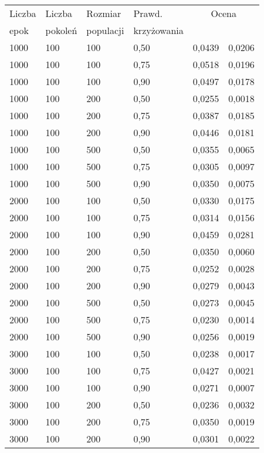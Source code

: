 \documentclass[11pt,a4paper,oneside]{report}
\begin{document}
\begin{center} 
	\begin{longtable}{|l|l|l|l|r@{$\pm$}r|}
		\hline
		Liczba & Liczba & Rozmiar & Prawd. & \multicolumn{2}{|c|}{Ocena} \\
		epok & pokoleń & populacji & krzyżowania & \multicolumn{2}{|c|}{}\\ \hline \hline\endhead
		1000 & 100 & 100 & 0,50 & 0,0439 & 0,0206\\ \hline
		1000 & 100 & 100 & 0,75 & 0,0518 & 0,0196\\ \hline
		1000 & 100 & 100 & 0,90 & 0,0497 & 0,0178\\ \hline
		1000 & 100 & 200 & 0,50 & 0,0255 & 0,0018\\ \hline
		1000 & 100 & 200 & 0,75 & 0,0387 & 0,0185\\ \hline
		1000 & 100 & 200 & 0,90 & 0,0446 & 0,0181\\ \hline
		1000 & 100 & 500 & 0,50 & 0,0355 & 0,0065\\ \hline
		1000 & 100 & 500 & 0,75 & 0,0305 & 0,0097\\ \hline
		1000 & 100 & 500 & 0,90 & 0,0350 & 0,0075\\ \hline
		2000 & 100 & 100 & 0,50 & 0,0330 & 0,0175\\ \hline
		2000 & 100 & 100 & 0,75 & 0,0314 & 0,0156\\ \hline
		2000 & 100 & 100 & 0,90 & 0,0459 & 0,0281\\ \hline
		2000 & 100 & 200 & 0,50 & 0,0350 & 0,0060\\ \hline
		2000 & 100 & 200 & 0,75 & 0,0252 & 0,0028\\ \hline
		2000 & 100 & 200 & 0,90 & 0,0279 & 0,0043\\ \hline
		2000 & 100 & 500 & 0,50 & 0,0273 & 0,0045\\ \hline
		2000 & 100 & 500 & 0,75 & 0,0230 & 0,0014\\ \hline
		2000 & 100 & 500 & 0,90 & 0,0256 & 0,0019\\ \hline
		3000 & 100 & 100 & 0,50 & 0,0238 & 0,0017\\ \hline
		3000 & 100 & 100 & 0,75 & 0,0427 & 0,0021\\ \hline
		3000 & 100 & 100 & 0,90 & 0,0271 & 0,0007\\ \hline
		3000 & 100 & 200 & 0,50 & 0,0236 & 0,0032\\ \hline
		3000 & 100 & 200 & 0,75 & 0,0350 & 0,0019\\ \hline
		3000 & 100 & 200 & 0,90 & 0,0301 & 0,0022\\ \hline

\end{longtable}
\end{center}
\end{document}
